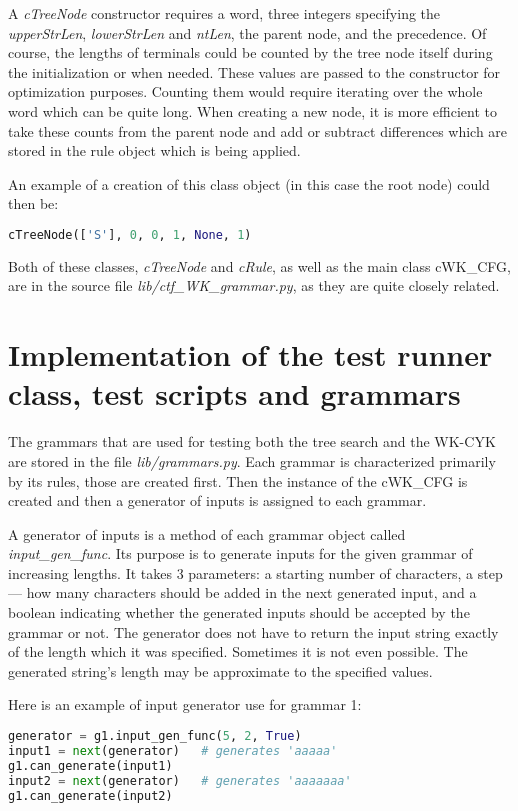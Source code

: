 A \textit{cTreeNode} constructor requires a word, three integers specifying the \textit{upperStrLen}, \textit{lowerStrLen} and \textit{ntLen}, the parent node, and the precedence. Of course, the lengths of terminals could be counted by the tree node itself during the initialization or when needed. These values are passed to the constructor for optimization purposes. Counting them would require iterating over the whole word which can be quite long. When creating a new node, it is more efficient to take these counts from the parent node and add or subtract differences which are stored in the rule object which is being applied.

An example of a creation of this class object (in this case the root node) could then be:

\begin{lstlisting}[language=Python]
  cTreeNode(['S'], 0, 0, 1, None, 1)
\end{lstlisting}

\bigskip

Both of these classes, \textit{cTreeNode} and \textit{cRule}, as well as the main class cWK\_CFG, are in the source file \textit{lib/ctf\_WK\_grammar.py}, as they are quite closely related.


\section{Implementation of the test runner class, test scripts and grammars}
The grammars that are used for testing both the tree search and the WK-CYK are stored in the file \textit{lib/grammars.py}. Each grammar is characterized primarily by its rules, those are created first. Then the instance of the cWK\_CFG is created and then a generator of inputs is assigned to each grammar.

A generator of inputs is a method of each grammar object called \textit{input\_gen\_func}. Its purpose is to generate inputs for the given grammar of increasing lengths. It takes 3 parameters: a starting number of characters, a step --- how many characters should be added in the next generated input, and a boolean indicating whether the generated inputs should be accepted by the grammar or not. The generator does not have to return the input string exactly of the length which it was specified. Sometimes it is not even possible. The generated string's length may be approximate to the specified values.

Here is an example of input generator use for grammar 1:
\begin{lstlisting}[language=Python]
generator = g1.input_gen_func(5, 2, True)
input1 = next(generator)   # generates 'aaaaa'
g1.can_generate(input1)
input2 = next(generator)   # generates 'aaaaaaa'
g1.can_generate(input2)
\end{lstlisting}

